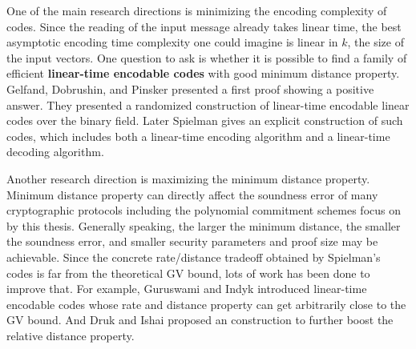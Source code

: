 One of the main research directions is minimizing the encoding complexity
of codes. Since the reading of the input message already takes linear time, the best asymptotic encoding time complexity one could imagine is linear in $k$, the size of the input vectors. One question to ask is whether it is possible to find a family of efficient \textbf{linear-time encodable codes} with good minimum distance property. Gelfand, Dobrushin, and Pinsker \cite{gelfand1973complexity} presented a first proof showing a positive answer. They presented a randomized construction of linear-time encodable linear codes over the binary field. Later Spielman \cite{DBLP:conf/stoc/Spielman95} gives an explicit construction of such codes, which includes both a linear-time encoding algorithm and a linear-time decoding algorithm.

Another research direction is maximizing the minimum distance property. Minimum distance property can directly affect the soundness error of many cryptographic protocols including the polynomial commitment schemes focus on by this thesis. Generally speaking, the larger the minimum distance, the smaller the soundness error, and smaller security parameters and proof size may be achievable. Since the concrete rate/distance tradeoff obtained by Spielman’s codes is far from the theoretical GV bound, lots of work has been done to improve that. For example, Guruswami and Indyk \cite{DBLP:journals/tit/GuruswamiI05} introduced linear-time encodable codes whose rate and distance property can get arbitrarily close to the GV bound. And Druk and Ishai \cite{10.1145/2554797.2554815} proposed an construction to further boost the relative distance property. 




